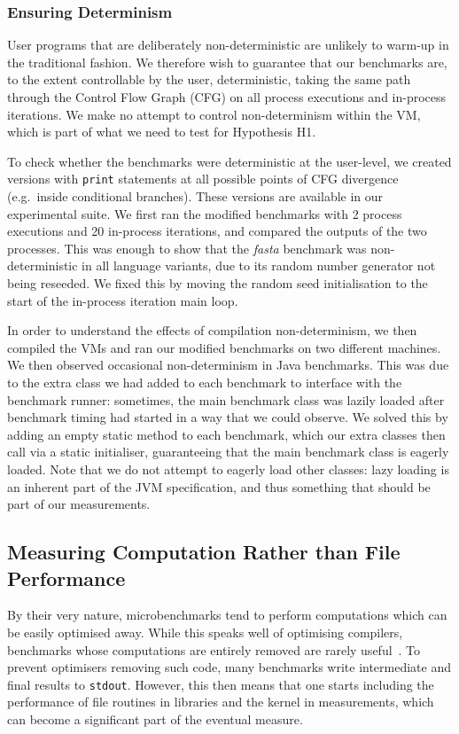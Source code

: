 \documentclass[acmsmall,screen]{acmart}
\newcommand{\hypone}{H1\xspace}
\newcommand{\fasta}{\emph{fasta}\xspace}
\begin{document}
\subsubsection{Ensuring Determinism}

User programs that are deliberately non-deterministic are unlikely to
warm-up in the traditional fashion.
We therefore wish to guarantee that our benchmarks are,
to the extent controllable by the user, deterministic, taking
the same path through the Control Flow Graph (CFG)
on all process executions and in-process iterations. We make no attempt to
control non-determinism within the VM, which is part of what we need to test for
Hypothesis \hypone.

To check whether the benchmarks were deterministic at the user-level, we created
versions with \texttt{print} statements at all possible points of CFG
divergence (e.g.~inside conditional branches).
These versions are available in our experimental suite. We first ran the modified
benchmarks with 2 process executions and 20 in-process iterations,
and compared the outputs of the two processes. This was enough to show that the
\fasta benchmark was non-deterministic
in all language variants, due to its random number generator not being reseeded. We
fixed this by moving the random seed initialisation to the start
of the in-process iteration main loop.

In order to understand the effects of compilation non-determinism,
we then compiled the VMs and ran our modified benchmarks on two different machines.
We then observed occasional non-determinism in Java benchmarks.
This was due to the extra class we had added to each benchmark
to interface with the benchmark runner: sometimes, the
main benchmark class was lazily loaded after benchmark timing had started in a
way that we could observe. We
solved this by adding an empty static method to each benchmark, which our
extra classes then call via a static initialiser, guaranteeing that
the main benchmark class is eagerly loaded. Note that we do not attempt to eagerly
load other classes: lazy loading is an inherent part of the JVM specification,
and thus something that should be part of our measurements.


\subsection{Measuring Computation Rather than File Performance}

By their very nature, microbenchmarks tend to perform computations which
can be easily optimised away. While this speaks well of
optimising compilers, benchmarks whose computations
are entirely removed are rarely useful~\cite{seaton15phd}. To prevent optimisers
removing such code, many benchmarks write intermediate and final results
to \texttt{stdout}. However, this then means that one starts including
the performance of file routines in libraries and the kernel in measurements,
which can become a significant part of the eventual measure.
\end{document}
